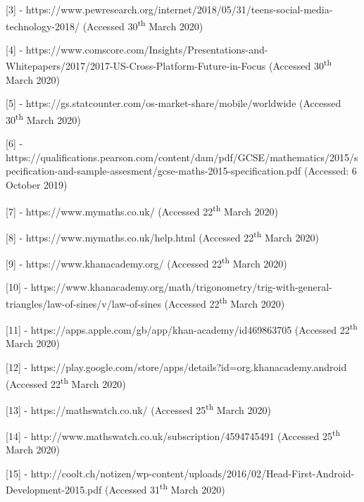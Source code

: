 \documentclass{article}
\begin{document}
[3] - https://www.pewresearch.org/internet/2018/05/31/teens-social-media-technology-2018/ (Accessed 30\textsuperscript{th} March 2020) \par

[4] - https://www.comscore.com/Insights/Presentations-and-Whitepapers/2017/2017-US-Cross-Platform-Future-in-Focus (Accessed 30\textsuperscript{th} March 2020) \par

[5] - https://gs.statcounter.com/os-market-share/mobile/worldwide (Accessed 30\textsuperscript{th} March 2020) \par

[6] - https://qualifications.pearson.com/content/dam/pdf/GCSE/mathematics/2015/specification-and-sample-assesment/gcse-maths-2015-specification.pdf (Accessed: 6 October 2019) \par

[7] - https://www.mymaths.co.uk/ (Accessed 22\textsuperscript{th} March 2020) \par

[8] - https://www.mymaths.co.uk/help.html (Accessed 22\textsuperscript{th} March 2020) \par

[9] - https://www.khanacademy.org/ (Accessed 22\textsuperscript{th} March 2020) \par

[10] - https://www.khanacademy.org/math/trigonometry/trig-with-general-triangles/law-of-sines/v/law-of-sines (Accessed 22\textsuperscript{th} March 2020) \par

[11] - https://apps.apple.com/gb/app/khan-academy/id469863705 (Accessed 22\textsuperscript{th} March 2020) \par

[12] - https://play.google.com/store/apps/details?id=org.khanacademy.android (Accessed 22\textsuperscript{th} March 2020) \par

[13] - https://mathswatch.co.uk/ (Accessed 25\textsuperscript{th} March 2020) \par

[14] - http://www.mathswatch.co.uk/subscription/4594745491 (Accessed 25\textsuperscript{th} March 2020) \par

[15] - http://coolt.ch/notizen/wp-content/uploads/2016/02/Head-First-Android-Development-2015.pdf (Accessed 31\textsuperscript{th} March 2020) \par
\end{document}
